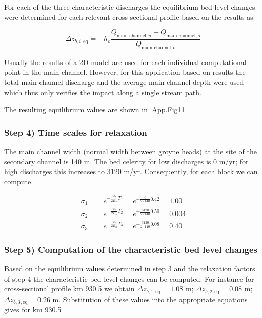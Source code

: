 For each of the three characteristic discharges the equilibrium bed level changes were determined for each relevant cross-sectional profile based on the \sobek results as

\begin{equation}
\Delta z_{b,i,\text{eq}} = -h_o \frac{Q_{\text{main channel},n} - Q_{\text{main channel},o}}{Q_{\text{main channel},o}}
\end{equation}

\Note Usually the results of a 2D model are used for each individual computational point in the main channel.
However, for this application based on \sobek results the total main channel discharge and the average main channel depth were used which thus only verifies the impact along a single stream path.

The resulting equilibrium values are shown in \autoref{App.Fig11}.

\subsubsection*{Step 4) Time scales for relaxation}

The main channel width (normal width between groyne heads) at the site of the secondary channel is 140 m.
The bed celerity for low discharges is 0 m/yr; for high discharges this increases to 3120 m/yr.
Consequently, for each block we can compute

\begin{align}
\sigma_1 &= e^{-\frac{w_l}{2B_n}T_1} = e^{-\frac{0}{2 \cdot 140} 0.42} = 1.00 \\
\sigma_2 &= e^{-\frac{w_l}{2B_n}T_2} = e^{-\frac{3120}{2 \cdot 140} 0.50} = 0.004 \\
\sigma_3 &= e^{-\frac{w_l}{2B_n}T_3} = e^{-\frac{3120}{2 \cdot 140} 0.08} = 0.40
\end{align}

\subsubsection*{Step 5) Computation of the characteristic bed level changes}

Based on the equilibrium values determined in step 3 and the relaxation factors of step 4 the characteristic bed level changes can be computed.
For instance for cross-sectional profile km 930.5 we obtain $\Delta z_{b,1,\text{eq}} = 1.08$ m; $\Delta z_{b,2,\text{eq}} = 0.08$ m; $\Delta z_{b,3,\text{eq}} = 0.26$ m.
Substitution of these values into the appropriate equations gives for km 930.5

